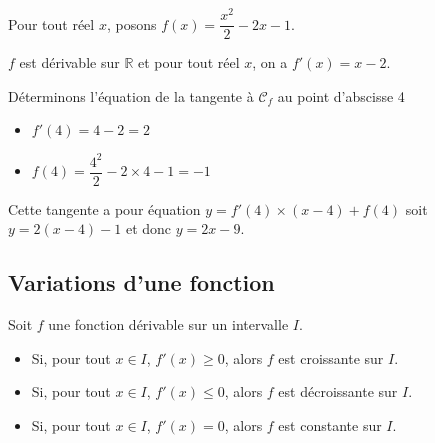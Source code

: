 \documentclass[11pt,fleqn, openany]{book} %
\begin{document}
\begin{example}Pour tout réel $x$, posons $f(x)=\dfrac{x^2}{2}-2x-1$. 

\begin{minipage}{0.6\linewidth}$f$ est dérivable sur $\mathbb{R}$ et pour tout réel $x$, on a $f'(x)=x-2$.

Déterminons l'équation de la tangente à $\mathcal{C}_f$ au point d'abscisse 4 
\begin{itemize}
\item $f'(4)=4-2=2$
\item $f(4)=\dfrac{4^2}{2}-2 \times 4 -1 = -1$
\end{itemize}
 Cette tangente a pour équation $y = f'(4) \times (x-4)+f(4)$ soit $y = 2(x-4)-1$ et donc $y=2x-9$.
\end{minipage}\hfill\begin{minipage}{0.35\linewidth}
\begin{center}
\end{center}
\end{minipage}
 \end{example}



\subsection{Variations d'une fonction}

\begin{proposition}Soit $f$ une fonction dérivable sur un intervalle $I$.
\begin{itemize}
\item Si, pour tout $x\in I$, $f'(x) \geqslant 0$, alors $f$ est croissante sur $I$.
\item Si, pour tout $x\in I$, $f'(x) \leqslant 0$, alors $f$ est décroissante sur $I$.
\item Si, pour tout $x\in I$, $f'(x) =0$, alors $f$ est constante sur $I$.
\end{itemize}\end{proposition}
\end{document}
